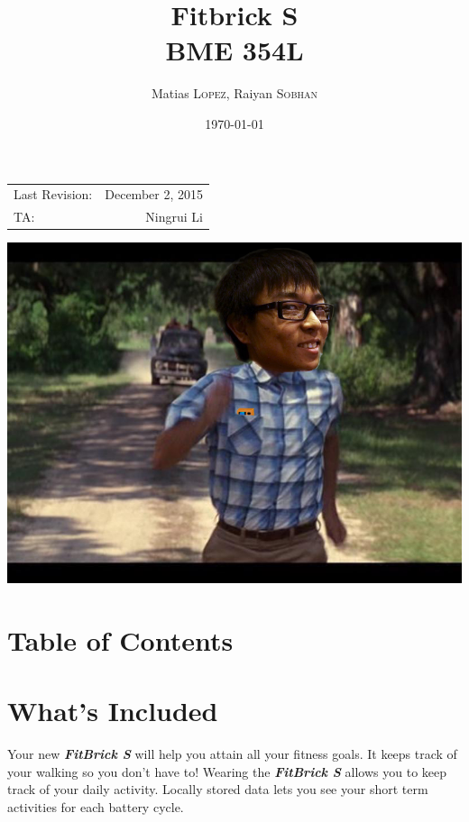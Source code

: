 \documentclass{article}
\title{Fitbrick S\\ BME 354L}
\author{Matias \textsc{Lopez}, Raiyan \textsc{Sobhan}}
\date{\today}
\begin{document}
\maketitle %

\begin{center}
\begin{tabular}{l r}
Last Revision: & December 2, 2015 \\
TA: & Ningrui Li %
\end{tabular}
\end{center}

\includegraphics[width=5.5in]{ningrui}

\section*{Table of Contents}
\tableofcontents

\pagebreak

\section{What's Included}
Your new \textbf{\textit{FitBrick S}} will help you attain all your fitness goals. It keeps track of your walking so you don't have to!  Wearing the \textbf{\textit{FitBrick S}} allows you to keep track of your daily activity. Locally stored data lets you see your short term activities for each battery cycle. 
\end{document}
